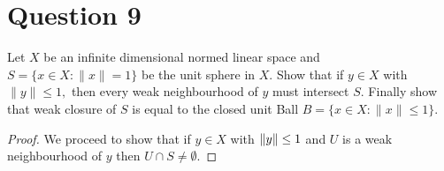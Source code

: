 \section{Question 9}
\horz

Let $X$ be an infinite dimensional normed linear space and $S= \{ x\in X : \|x\|=1\}$ be the unit sphere in $X.$ Show that  if $y\in X$ with $\|y\| \leqslant 1,$ then every weak neighbourhood of $y$ must intersect $S.$ Finally show that weak closure of $S$ is equal to the closed unit Ball $B= \{x\in X : \|x\| \leqslant 1 \}.$

\horz

\begin{proof}
    We proceed to show that if $y \in X$ with $\left\lVert y \right\rVert \le 1$ and $U$ is a weak neighbourhood of $y$ then $U \cap S \ne \emptyset$.
\end{proof}
